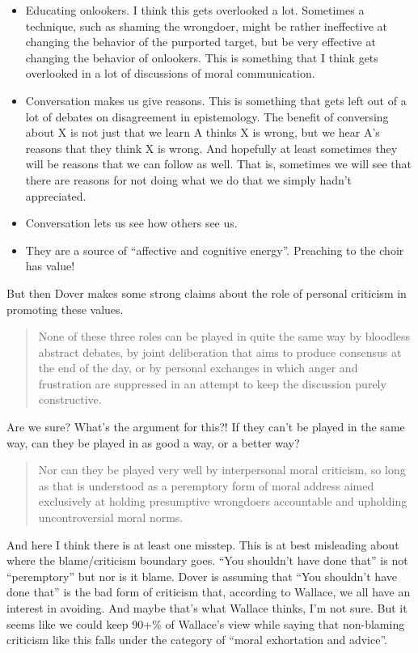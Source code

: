 \documentclass[
]{article}
\providecommand{\tightlist}{%
  \setlength{\itemsep}{0pt}\setlength{\parskip}{0pt}}
\begin{document}
\begin{itemize}
\tightlist
\item
  Educating onlookers. I think this gets overlooked a lot. Sometimes a
  technique, such as shaming the wrongdoer, might be rather ineffective
  at changing the behavior of the purported target, but be very
  effective at changing the behavior of onlookers. This is something
  that I think gets overlooked in a lot of discussions of moral
  communication.
\item
  Conversation makes us give reasons. This is something that gets left
  out of a lot of debates on disagreement in epistemology. The benefit
  of conversing about X is not just that we learn A thinks X is wrong,
  but we hear A's reasons that they think X is wrong. And hopefully at
  least sometimes they will be reasons that we can follow as well. That
  is, sometimes we will see that there are reasons for not doing what we
  do that we simply hadn't appreciated.
\item
  Conversation lets us see how others see us.
\item
  They are a source of ``affective and cognitive energy''. Preaching to
  the choir has value!
\end{itemize}

But then Dover makes some strong claims about the role of personal
criticism in promoting these values.

\begin{quote}
None of these three roles can be played in quite the same way by
bloodless abstract debates, by joint deliberation that aims to produce
consensus at the end of the day, or by personal exchanges in which anger
and frustration are suppressed in an attempt to keep the discussion
purely constructive.
\end{quote}

Are we sure? What's the argument for this?! If they can't be played in
the same way, can they be played in as good a way, or a better way?

\begin{quote}
Nor can they be played very well by interpersonal moral criticism, so
long as that is understood as a peremptory form of moral address aimed
exclusively at holding presumptive wrongdoers accountable and upholding
uncontroversial moral norms.
\end{quote}

And here I think there is at least one misstep. This is at best
misleading about where the blame/criticism boundary goes. ``You
shouldn't have done that'' is not ``peremptory'' but nor is it blame.
Dover is assuming that ``You shouldn't have done that'' is the bad form
of criticism that, according to Wallace, we all have an interest in
avoiding. And maybe that's what Wallace thinks, I'm not sure. But it
seems like we could keep 90+\% of Wallace's view while saying that
non-blaming criticism like this falls under the category of ``moral
exhortation and advice''.
\end{document}
